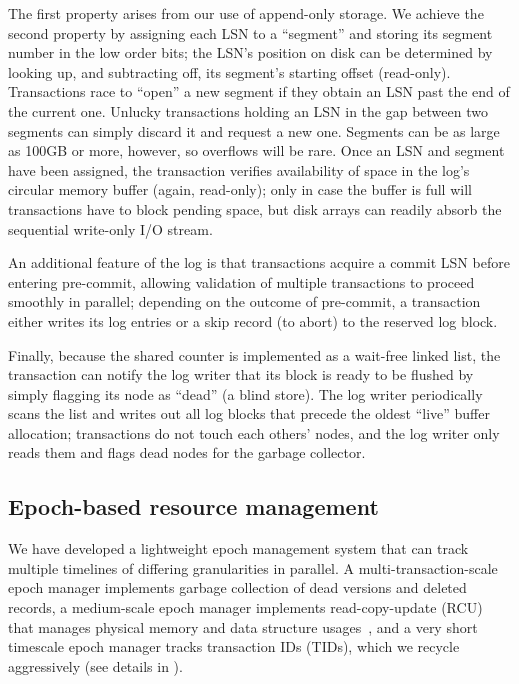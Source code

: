 The first property arises from our use of append-only storage. We achieve the second property by assigning each LSN to a ``segment'' and storing its segment number in the low order bits; the LSN's position on disk can be determined by looking up, and subtracting off, its segment's starting offset (read-only). Transactions race to ``open'' a new segment if they obtain an LSN past the end of the current one. Unlucky transactions holding an LSN in the gap between two segments can simply discard it and request a new one. Segments can be as large as 100GB or more, however, so overflows will be rare. Once an LSN and segment have been assigned, the transaction verifies availability of space in the log's circular memory buffer (again, read-only); only in case the buffer is full will transactions have to block pending space, but disk arrays can readily absorb the sequential write-only I/O stream.

An additional feature of the log is that transactions acquire a commit LSN before entering pre-commit, allowing validation of multiple transactions to proceed smoothly in parallel; depending on the outcome of pre-commit, a transaction either writes its log entries or a skip record (to abort) to the reserved log block.

Finally, because the shared counter is implemented as a wait-free linked list, the transaction can notify the log writer that its block is ready to be flushed by simply flagging its node as ``dead'' (a blind store). The log writer periodically scans the list and writes out all log blocks that precede the oldest ``live'' buffer allocation; transactions do not touch each others' nodes, and the log writer only reads them and flags dead nodes for the garbage collector.

\subsection{Epoch-based resource management}
 We have developed a lightweight epoch management system that can track multiple timelines of differing granularities in parallel. A multi-transaction-scale epoch manager implements garbage collection of dead versions and deleted records, a medium-scale epoch manager implements read-copy-update (RCU) that manages physical memory and data structure usages~\cite{McKenneyS98}, and a very short timescale epoch manager tracks transaction IDs (TIDs), which we recycle aggressively (see details in ).

